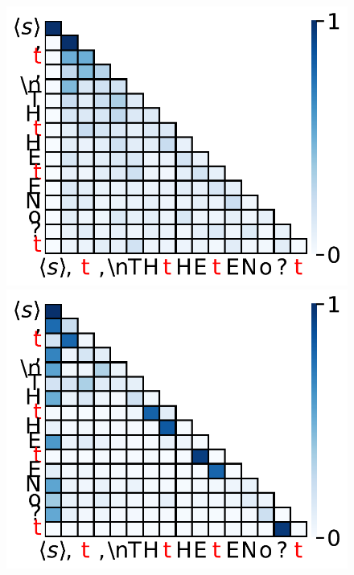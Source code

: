 \begin{figure}[h]
  \centering
  \begin{minipage}{0.3\textwidth}
      \centering
      \vspace{-.2em}
      \includegraphics[width=\linewidth]{Figures/BBM_appendix/massive_attn_step10k_fig0.pdf}
  \end{minipage}
  \begin{minipage}{0.3\textwidth}
      \centering
      \vspace{-.2em}
      \includegraphics[width=\linewidth]{Figures/BBM_appendix/massive_attn_step10k_fig1.pdf}

\end{minipage}
\end{figure}
